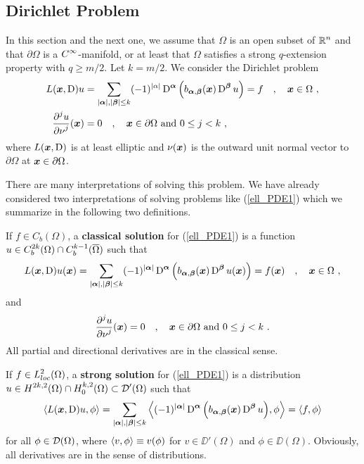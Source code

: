 \subsection{Dirichlet Problem}

In this section and the next one, we assume that $\Omega$ is an open
subset of $\displaystyle \mathbb{R}^n$ and that $\partial \Omega$ is a
$\displaystyle C^\infty$-manifold, or at least that $\Omega$ satisfies
a strong $q$-extension property with $q\geq m/2$.  Let $k = m/2$.
We consider the Dirichlet problem
\begin{equation} \label{ell_PDE1}
\begin{split}
L({\bm{x}}, \operatorname{D})u &= \sum_{|{\bm{\alpha}}|,|{\bm{\beta}}|\leq k}
(-1)^{|\alpha|} \operatorname{D}^{{\bm{\alpha}}}
\left( b_{{\bm{\alpha}},{\bm{\beta}}}({\bm{x}}) \operatorname{D}^{{\bm{\beta}}} u\right)
= f \quad , \quad
{\bm{x}} \in \Omega \ ,\\
\frac{\displaystyle \partial^{j}{u}} {\displaystyle \partial \nu^{j}}({\bm{x}}) &= 0 \quad , \quad
{\bm{x}} \in \partial \Omega \ \text{and}\  0 \leq j < k \ ,
\end{split}
\end{equation}
where $L({\bm{x}}, \operatorname{D})$ is at least elliptic and $\nu({\bm{x}})$ is
the outward unit normal vector to $\partial \Omega$ at
${\bm{x}} \in \partial \Omega$.

There are many interpretations of solving this problem.  We have already
considered two interpretations of solving problems like (\ref{ell_PDE1})
which we summarize in the following two definitions.

\begin{defn}
If $f \in C_b(\Omega)$, a {\bfseries classical solution}
for (\ref{ell_PDE1}) is a function
$\displaystyle u \in C^{2k}_b(\Omega) \cap C^{k-1}_b(\overline{\Omega})$
such that
\[
L(\VEC{x},\diff)u(\VEC{x}) = \sum_{|\VEC{\alpha}|,|\VEC{\beta}|\leq k}
(-1)^{|\VEC{\alpha}|} \diff^{\VEC{\alpha}}
\left( b_{\VEC{\alpha},\VEC{\beta}}(\VEC{x}) \diff^{\VEC{\beta}}
u(\VEC{x}) \right) = f(\VEC{x}) \quad , \quad \VEC{x} \in \Omega \ ,
\]
and
\[
\frac{\displaystyle \partial^{j}{u}} {\displaystyle \partial \nu^{j}}({\bm{x}}) = 0 \quad , \quad
{\bm{x}} \in \partial \Omega \ \text{and}\ 0 \leq j < k \ .
\]
All partial and directional derivatives are in the classical sense.
\end{defn}

\begin{defn}
If $\displaystyle f\in L_{loc}^2(\Omega)$, a {\bfseries strong solution}
for (\ref{ell_PDE1}) is a distribution
$\displaystyle u \in H^{2k,2}(\Omega) \cap H^{k,2}_0(\Omega) \subset
\mathcal{D}'(\Omega)$ such that
\[
\left\langle{ L({\bm{x}},\operatorname{D})u} , {\phi}\right\rangle =
\sum_{|{\bm{\alpha}}|,|{\bm{\beta}}|\leq k} \left\langle{ (-1)^{|{\bm{\alpha}}|}
\operatorname{D}^{{\bm{\alpha}}} \left( b_{{\bm{\alpha}},{\bm{\beta}}}({\bm{x}})
\operatorname{D}^{{\bm{\beta}}} u \right) } , {\phi}\right\rangle = \left\langle{f} , {\phi}\right\rangle
\]
for all $\displaystyle \phi \in \mathcal{D}(\Omega)$,
where $\left\langle{v} , {\phi}\right\rangle \equiv v(\phi)$ for $v\in \DD'(\Omega)$ and
$\phi \in \DD(\Omega)$.  Obviously, all derivatives are in the sense
of distributions.
\end{defn}

